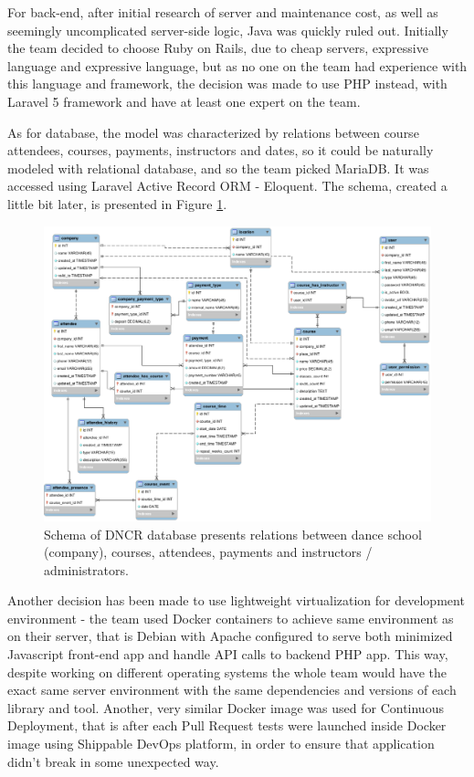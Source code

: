 \documentclass{article}
\begin{document}
For back-end, after initial research of server and maintenance cost, as well as seemingly uncomplicated server-side logic, Java was quickly ruled out. Initially the team decided to choose Ruby on Rails, due to cheap servers, expressive language and expressive language, but as no one on the team had experience with this language and framework, the decision was made to use PHP instead, with Laravel 5 framework and have at least one expert on the team.

As for database, the model was characterized by relations between course attendees, courses, payments, instructors and dates, so it could be naturally modeled with relational database, and so the team picked MariaDB. It was accessed using Laravel Active Record ORM - Eloquent. The schema, created a little bit later, is presented in Figure \ref{fig:schema}.

\begin{figure}[h]
    \includegraphics[width=\textwidth]{schema}
    \caption{Schema of DNCR database presents relations between dance school (company), courses, attendees, payments and instructors / administrators.}
    \label{fig:schema} 
\end{figure}

Another decision has been made to use lightweight virtualization for development environment - the team used Docker containers to achieve same environment as on their server, that is Debian with Apache configured to serve both minimized Javascript front-end app and handle API calls to backend PHP app. This way, despite working on different operating systems  the whole team would have the exact same server environment with the same dependencies and versions of each library and tool. Another, very similar Docker image was used for Continuous Deployment, that is after each Pull Request tests were launched inside Docker image using Shippable DevOps platform, in order to ensure that application didn't break in some unexpected way.
\end{document}
